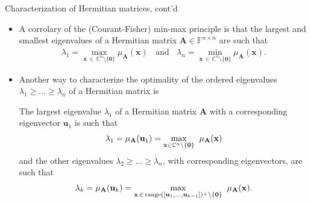 \documentclass[t,usepdftitle=false]{beamer}
\begin{document}
\begin{frame}{Characterization of Hermitian matrices, cont'd}
\begin{itemize}
\item A corrolary of the (Courant-Fisher) min-max principle is that the largest and smallest eigenvalues of a Hermitian matrix $\mathbf{A}\in\mathbb{F}^{n\times n}$ are such that
\begin{align*}
\lambda_1=\underset{\mathbf{x}\,\in\,\mathbb{C}^n\setminus{\{\mathbf{0}\}}}{\max}\mu_{\mathbf{A}}(\mathbf{x})
\;\;\text{ and }\;\;
\lambda_n=\underset{\mathbf{x}\,\in\,\mathbb{C}^n\setminus{\{\mathbf{0}\}}}{\min}\mu_{\mathbf{A}}(\mathbf{x}).
\end{align*}
\item Another way to characterize the optimality of the ordered eigenvalues $\lambda_1\geq\dots\geq\lambda_n$ of a Hermitian matrix is
\begin{theorem}
The largest eigenvalue $\lambda_1$ of a Hermitian matrix $\mathbf{A}$ 
with a corresponding eigenvector $\mathbf{u}_1$ is such that\vspace{-.2cm}
\begin{align*}
\lambda_1=\mu_{\mathbf{A}}(\mathbf{u}_1)=
\underset{\mathbf{x}\in\mathbb{C}^n\setminus\{\mathbf{0}\}}{\max}
\hspace{.2cm}
\mu_{\mathbf{A}}(\mathbf{x})
\end{align*}
and the other eigenvalues $\lambda_2\geq\dots\geq\lambda_n$, with corresponding eigenvectors, are such that\vspace{-.2cm}
\begin{align*}
\lambda_k=\mu_{\mathbf{A}}(\mathbf{u}_k)=
\underset{\mathbf{x}\,\in\,\mathrm{range}([\mathbf{u}_1,\dots,\mathbf{u}_{k-1}])^\perp\setminus\{\mathbf{0}\}}{\max}
\hspace{.2cm}
\mu_{\mathbf{A}}(\mathbf{x}).
\end{align*}
\end{theorem}
\end{itemize}
\end{frame}
\end{document}
